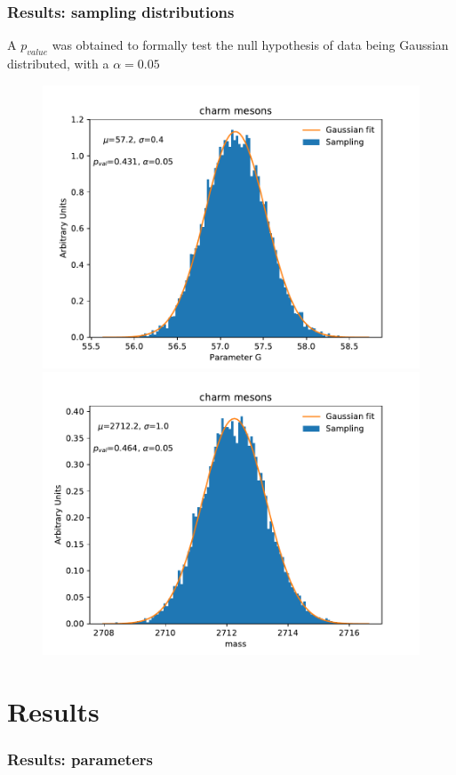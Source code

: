\documentclass[10pt]{beamer}
\begin{document}
\begin{frame}
\frametitle{Results: sampling distributions}
\scriptsize{A $p_{value}$ was obtained to formally test the null hypothesis of data being Gaussian distributed, with a $\alpha = 0.05$}
\begin{figure}
   \includegraphics[scale=0.325]{./Plots/charm_bootstrap_g_All.pdf}
   \includegraphics[scale=0.325]{./Plots/charm_bootstrap_mass_All.pdf}   
\end{figure}

\end{frame}



\section{Results}
\begin{frame}
\frametitle{Results: parameters}
\scriptsize{
\begin{table}[tb!]
\begin{center}


\end{center}
\end{table}
}
\end{frame}
\end{document}
